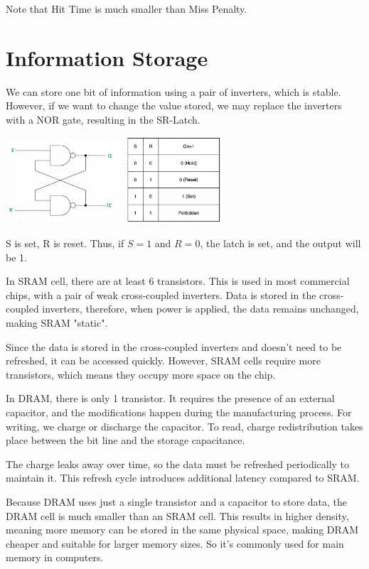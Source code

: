 \begin{remark}
  Note that Hit Time is much smaller than Miss Penalty.
\end{remark}

\section{Information Storage}
We can store one bit of information using a pair of inverters, which is stable. However, if we want to change the value stored, we may replace the inverters with a NOR gate, resulting in the SR-Latch.

\begin{center}
  \includegraphics[width=0.6\textwidth]{Figure/SR_latch.png}
\end{center}

\begin{remark}
  S is set, R is reset. Thus, if \(S = 1\) and \(R = 0\), the latch is set, and the output will be 1.
\end{remark}

In SRAM cell, there are at least 6 transistors. This is used in most commercial chips, with a pair of weak cross-coupled inverters. Data is stored in the cross-coupled inverters, therefore, when power is applied, the data remains unchanged, making SRAM "static".

Since the data is stored in the cross-coupled inverters and doesn't need to be refreshed, it can be accessed quickly. However, SRAM cells require more transistors, which means they occupy more space on the chip.

In DRAM, there is only 1 transistor. It requires the presence of an external capacitor, and the modifications happen during the manufacturing process. For writing, we charge or discharge the capacitor. To read, charge redistribution takes place between the bit line and the storage capacitance.

The charge leaks away over time, so the data must be refreshed periodically to maintain it. This refresh cycle introduces additional latency compared to SRAM.

Because DRAM uses just a single transistor and a capacitor to store data, the DRAM cell is much smaller than an SRAM cell. This results in higher density, meaning more memory can be stored in the same physical space, making DRAM cheaper and suitable for larger memory sizes. So it’s commonly used for main memory in computers.

